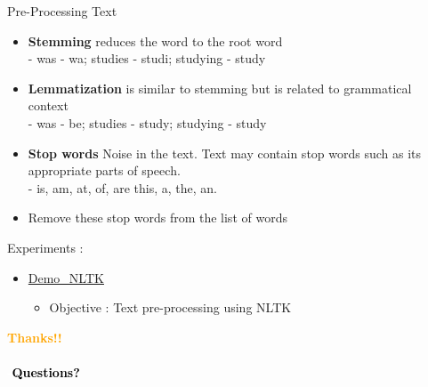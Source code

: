 \documentclass[aspectratio=169,12pt]{beamer}
\begin{document}
\begin{frame}[t]{Pre-Processing Text}
\begin{itemize}
\itemsep1em 
\item \textbf{Stemming} reduces the word to the root word\\
\alert - was - wa; studies - studi; studying - study
\item \textbf{Lemmatization} is similar to stemming but is related to grammatical context\\
\alert - was - be; studies - study; studying - study
\item \textbf{Stop words}  Noise in the text. Text may contain stop words such as its appropriate parts of speech. \\
\alert - is, am, at, of, are this, a, the, an.
\item Remove these stop words from the list of words
\end{itemize}
\end{frame}


\begin{frame}{Experiments : }
\begin{itemize}
\item \href{https://drive.google.com/file/d/1Z8ogpw23P4GarSHCdTJQ_MeHVQTJ2xNg/view?usp=sharing}{Demo\_NLTK} 
	\begin{itemize}
		\item Objective : Text pre-processing using NLTK
	\end{itemize}

\end{itemize}
\end{frame}

\begin{frame}
\begin{center}
\centering 
\textbf{\textcolor{orange}{\Huge \vspace{8pt} Thanks!!\\}}
\textcolor{white}{\\}
\centering
\textbf{\textcolor{black}{\Huge \textcolor{white}{-}Questions?}}
\end{center}
\end{frame}
\end{document}
